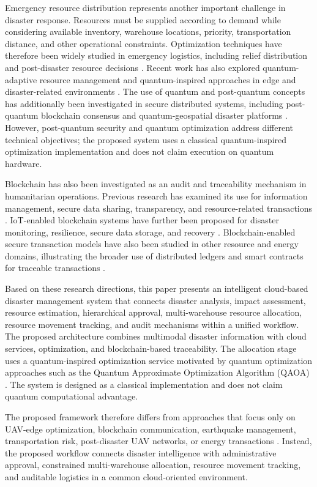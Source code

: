 \documentclass[conference]{IEEEtran}
\begin{document}
Emergency resource distribution represents another important challenge in disaster response. Resources must be supplied according to demand while considering available inventory, warehouse locations, priority, transportation distance, and other operational constraints. Optimization techniques have therefore been widely studied in emergency logistics, including relief distribution and post-disaster resource decisions \cite{ref16}. Recent work has also explored quantum-adaptive resource management and quantum-inspired approaches in edge and disaster-related environments \cite{ref1, ref4}. The use of quantum and post-quantum concepts has additionally been investigated in secure distributed systems, including post-quantum blockchain consensus and quantum-geospatial disaster platforms \cite{ref15, ref17}. However, post-quantum security and quantum optimization address different technical objectives; the proposed system uses a classical quantum-inspired optimization implementation and does not claim execution on quantum hardware.

Blockchain has also been investigated as an audit and traceability mechanism in humanitarian operations. Previous research has examined its use for information management, secure data sharing, transparency, and resource-related transactions \cite{ref18, ref19}. IoT-enabled blockchain systems have further been proposed for disaster monitoring, resilience, secure data storage, and recovery \cite{ref20}. Blockchain-enabled secure transaction models have also been studied in other resource and energy domains, illustrating the broader use of distributed ledgers and smart contracts for traceable transactions \cite{ref21}.

Based on these research directions, this paper presents an intelligent cloud-based disaster management system that connects disaster analysis, impact assessment, resource estimation, hierarchical approval, multi-warehouse resource allocation, resource movement tracking, and audit mechanisms within a unified workflow. The proposed architecture combines multimodal disaster information with cloud services, optimization, and blockchain-based traceability. The allocation stage uses a quantum-inspired optimization service motivated by quantum optimization approaches such as the Quantum Approximate Optimization Algorithm (QAOA) \cite{ref22}. The system is designed as a classical implementation and does not claim quantum computational advantage.

The proposed framework therefore differs from approaches that focus only on UAV-edge optimization, blockchain communication, earthquake management, transportation risk, post-disaster UAV networks, or energy transactions \cite{ref1, ref3, ref11, ref19, ref21}. Instead, the proposed workflow connects disaster intelligence with administrative approval, constrained multi-warehouse allocation, resource movement tracking, and auditable logistics in a common cloud-oriented environment.
\end{document}

